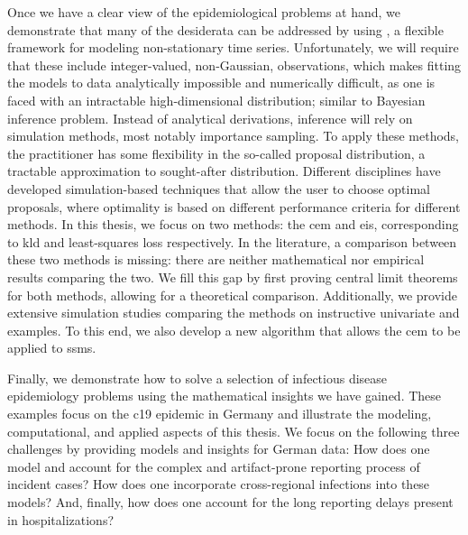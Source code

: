 Once we have a clear view of the epidemiological problems at hand, we demonstrate that many of the desiderata can be addressed by using , a flexible framework for modeling non-stationary time series. Unfortunately, we will require that these  include integer-valued, non-Gaussian, observations, which makes fitting the models to data analytically impossible and numerically difficult, as one is faced with an intractable high-dimensional distribution; similar to Bayesian inference problem. Instead of analytical derivations, inference will rely on simulation methods, most notably importance sampling. To apply these methods, the practitioner has some flexibility in the so-called proposal distribution, a tractable approximation to sought-after distribution. Different disciplines have developed simulation-based techniques that allow the user to choose optimal proposals, where optimality is based on different performance criteria for different methods. In this thesis, we focus on two methods: the \gls{cem} and \gls{eis}, corresponding to \acrlong{kld} and least-squares loss respectively. In the literature, a comparison between these two methods is missing: there are neither mathematical nor empirical results comparing the two. We fill this gap by first proving central limit theorems for both methods, allowing for a theoretical comparison. Additionally, we provide extensive simulation studies comparing the methods on instructive univariate and  examples. To this end, we also develop a new algorithm that allows the \acrshort{cem} to be applied to \glspl{ssm}. 

Finally, we demonstrate how to solve a selection of infectious disease epidemiology problems using the mathematical insights we have gained. These examples focus on the \acrshort{c19} epidemic in Germany and illustrate the modeling, computational, and applied aspects of this thesis. We focus on the following three challenges by providing models and insights for German data: How does one model and account for the complex and artifact-prone reporting process of incident cases? How does one incorporate cross-regional infections into these models? And, finally, how does one account for the long reporting delays present in hospitalizations?